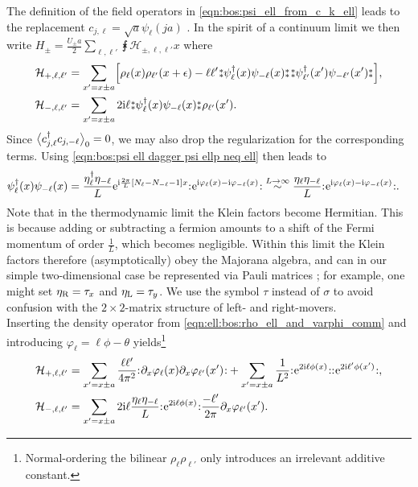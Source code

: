 The definition of the field operators in \autoref{eqn:bos:psi_ell_from_c_k_ell} leads to the replacement $c_{j,\ell} = \sqrt{a} \psi_\ell(ja)$ \cite{MajoranaZeroModes_PeriodicallyGated_Malard_2015}.
In the spirit of a continuum limit we then write $H_\pm = \frac{U_\pm a}{2} \sum_{\ell,\ell'} \intx{ }{ }{\mathcal{H}_{\pm,\ell,\ell'}}{x}$ where
\begin{align*} 
\mathcal{H}_{+,\ell,\ell'} &= \sum_{x'=x\pm a} \klb*{\rho_\ell(x) \rho_{\ell'}(x+\epsilon) -\ell\ell' \varnormord{\psi_\ell^\dagger(x) \psi_{-\ell}(x)} \varnormord{\psi_{\ell'}^\dagger(x') \psi_{-\ell'}(x')}},\\
\mathcal{H}_{-,\ell,\ell'} &= \sum_{x'=x\pm a}  2 \i\ell \varnormord{\psi_\ell^\dagger(x) \psi_{-\ell}(x)} \rho_{\ell'}(x').
\end{align*}
Since $\bra[\big]{c_{j,\ell}^\dagger c_{j,-\ell}}_0 = 0$, we may also drop the regularization for the corresponding terms.
Using \autoref{eqn:bos:psi ell dagger psi ellp neq ell} then leads to
\begin{align*}
\psi_\ell^\dagger(x) \psi_{-\ell}(x) &= \frac{\eta_\ell^\dagger\eta_{-\ell}}{L} \powe{\i \frac{2\pi}{L} \klb*{N_\ell - N_{-\ell} - 1}x} \normord{\powe{\i\varphi_\ell(x) - \i\varphi_{-\ell}(x)}} \overset{L\rightarrow \infty}{\sim} \frac{\eta_\ell \eta_{-\ell}}{L} \normord{\powe{\i\varphi_\ell(x) - \i\varphi_{-\ell}(x)}}.
\end{align*}
Note that in the thermodynamic limit the Klein factors become Hermitian.
This is because adding or subtracting a fermion amounts to a shift of the Fermi momentum of order $\frac{1}{L}$, which becomes negligible.
Within this limit the Klein factors therefore (asymptotically) obey the Majorana algebra, and can in our simple two-dimensional case be represented via Pauli matrices \cite[]{Bosonization_LL_LectureNotes_Schulz_1998}; for example, one might set $\eta_\R = \tau_x$ and $\eta_\L = \tau_y$.
We use the symbol $\tau$ instead of $\sigma$ to avoid confusion with the $2\times 2$-matrix structure of left- and right-movers.\\
Inserting the density operator from \autoref{eqn:ell:bos:rho_ell_and_varphi_comm} and introducing $\varphi_\ell = \ell\phi - \theta$ yields\footnote{Normal-ordering the bilinear $\rho_\ell \rho_{\ell'}$ only introduces an irrelevant additive constant.}
\begin{align*}
\mathcal{H}_{+,\ell,\ell'} &= \sum_{x'=x\pm a} \frac{\ell\ell'}{4\pi^2} \normord{\partial_x\varphi_\ell(x) \partial_x \varphi_{\ell'}(x')} + \sum_{x'=x\pm a} \frac{1}{L^2} \normord{\powe{2\i\ell \phi(x)}}  \normord{\powe{2\i\ell'\phi(x')}} ,\\
\mathcal{H}_{-,\ell,\ell'} &= \sum_{x'=x\pm a} 2 \i\ell \frac{\eta_\ell \eta_{-\ell}}{L} \normord{\powe{2\i\ell\phi(x)}} \frac{-\ell'}{2\pi}\partial_x\varphi_{\ell'}(x').
\end{align*}
